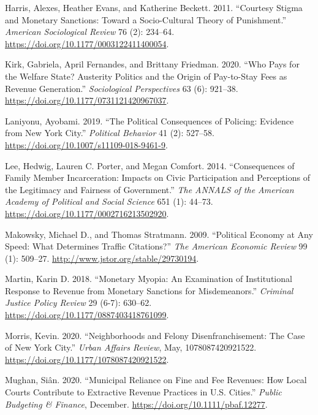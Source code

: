\documentclass[
  12pt,
]{article}
\newlength{\cslhangindent}
\newenvironment{cslreferences}%
  {\setlength{\parindent}{0pt}%
  \everypar{\setlength{\hangindent}{\cslhangindent}}\ignorespaces}%
  {\par}
\begin{document}
\begin{cslreferences}
\leavevmode\hypertarget{ref-Harris2011}{}%
Harris, Alexes, Heather Evans, and Katherine Beckett. 2011. ``Courtesy Stigma and Monetary Sanctions: Toward a Socio-Cultural Theory of Punishment.'' \emph{American Sociological Review} 76 (2): 234--64. \url{https://doi.org/10.1177/0003122411400054}.

\leavevmode\hypertarget{ref-Kirk2020}{}%
Kirk, Gabriela, April Fernandes, and Brittany Friedman. 2020. ``Who Pays for the Welfare State? Austerity Politics and the Origin of Pay-to-Stay Fees as Revenue Generation.'' \emph{Sociological Perspectives} 63 (6): 921--38. \url{https://doi.org/10.1177/0731121420967037}.

\leavevmode\hypertarget{ref-Laniyonu2019}{}%
Laniyonu, Ayobami. 2019. ``The Political Consequences of Policing: Evidence from New York City.'' \emph{Political Behavior} 41 (2): 527--58. \url{https://doi.org/10.1007/s11109-018-9461-9}.

\leavevmode\hypertarget{ref-Lee2014}{}%
Lee, Hedwig, Lauren C. Porter, and Megan Comfort. 2014. ``Consequences of Family Member Incarceration: Impacts on Civic Participation and Perceptions of the Legitimacy and Fairness of Government.'' \emph{The ANNALS of the American Academy of Political and Social Science} 651 (1): 44--73. \url{https://doi.org/10.1177/0002716213502920}.

\leavevmode\hypertarget{ref-Makowsky2009}{}%
Makowsky, Michael D., and Thomas Stratmann. 2009. ``Political Economy at Any Speed: What Determines Traffic Citations?'' \emph{The American Economic Review} 99 (1): 509--27. \url{http://www.jstor.org/stable/29730194}.

\leavevmode\hypertarget{ref-Martin2018}{}%
Martin, Karin D. 2018. ``Monetary Myopia: An Examination of Institutional Response to Revenue from Monetary Sanctions for Misdemeanors.'' \emph{Criminal Justice Policy Review} 29 (6-7): 630--62. \url{https://doi.org/10.1177/0887403418761099}.

\leavevmode\hypertarget{ref-Morris2020}{}%
Morris, Kevin. 2020. ``Neighborhoods and Felony Disenfranchisement: The Case of New York City.'' \emph{Urban Affairs Review}, May, 1078087420921522. \url{https://doi.org/10.1177/1078087420921522}.

\leavevmode\hypertarget{ref-Mughan2020}{}%
Mughan, Siân. 2020. ``Municipal Reliance on Fine and Fee Revenues: How Local Courts Contribute to Extractive Revenue Practices in U.S. Cities.'' \emph{Public Budgeting \& Finance}, December. \url{https://doi.org/10.1111/pbaf.12277}.


\end{cslreferences}
\end{document}
